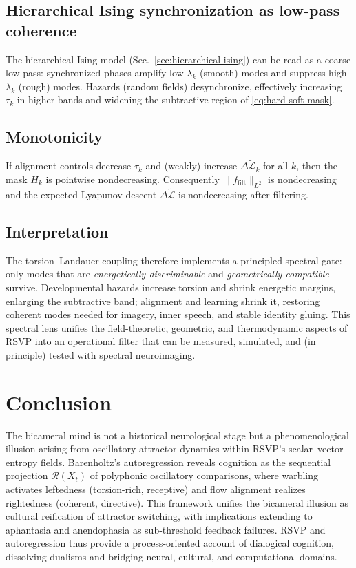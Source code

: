 \documentclass[a4paper,11pt]{article}
\begin{document}
\subsection{Hierarchical Ising synchronization as low-pass coherence}
The hierarchical Ising model (Sec.~\ref{sec:hierarchical-ising}) can be read as
a coarse low-pass: synchronized phases amplify low-$\lambda_k$ (smooth) modes
and suppress high-$\lambda_k$ (rough) modes. Hazards (random fields) desynchronize,
effectively increasing $\tau_k$ in higher bands and widening the subtractive
region of \eqref{eq:hard-soft-mask}.

\subsection{Monotonicity}
\begin{proposition}
If alignment controls decrease $\tau_k$ and (weakly) increase
$\Delta\widetilde{\mathcal{L}}_k$ for all $k$, then the mask $H_k$ is pointwise
nondecreasing. Consequently $\|f_{\mathrm{filt}}\|_{L^2}$ is nondecreasing and
the expected Lyapunov descent $\Delta\widetilde{\mathcal{L}}$ is nondecreasing
after filtering.
\end{proposition}

\subsection{Interpretation}
The torsion--Landauer coupling therefore implements a principled spectral
gate: only modes that are \emph{energetically discriminable} and \emph{geometrically
compatible} survive. Developmental hazards increase torsion and shrink energetic
margins, enlarging the subtractive band; alignment and learning shrink it,
restoring coherent modes needed for imagery, inner speech, and stable identity
gluing. This spectral lens unifies the field-theoretic, geometric, and
thermodynamic aspects of RSVP into an operational filter that can be measured,
simulated, and (in principle) tested with spectral neuroimaging.


\section{Conclusion}
\label{sec:conclusion}

The bicameral mind is not a historical neurological stage but a phenomenological illusion arising from oscillatory attractor dynamics within RSVP’s scalar–vector–entropy fields. Barenholtz’s autoregression reveals cognition as the sequential projection $\mathcal{R}(X_t)$ of polyphonic oscillatory comparisons, where warbling activates leftedness (torsion-rich, receptive) and flow alignment realizes rightedness (coherent, directive). This framework unifies the bicameral illusion as cultural reification of attractor switching, with implications extending to aphantasia and anendophasia as sub-threshold feedback failures. RSVP and autoregression thus provide a process-oriented account of dialogical cognition, dissolving dualisms and bridging neural, cultural, and computational domains.
\end{document}
